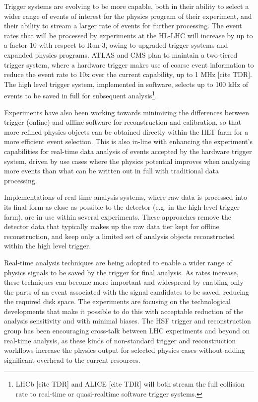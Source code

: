 \documentclass[10pt,a4paper]{article}
\begin{document}
Trigger systems are evolving to be more capable, both in their ability
to select a wider range of events of interest for the physics program of
their experiment, and their ability to stream a larger rate of events
for further processing. The event rates that will be processed by
experiments at the HL-LHC will increase by up to a factor 10 with
respect to Run-3, owing to upgraded trigger systems and expanded physics
programs. ATLAS and CMS plan to maintain a two-tiered trigger system,
where a hardware trigger makes use of coarse event information to reduce
the event rate to 10x over the current capability, up to 1 MHz {[}cite
TDR{]}. The high level trigger system, implemented in software, selects
up to 100 kHz of events to be saved in full for subsequent
analysis\footnote{LHCb {[}cite TDR{]} and ALICE {[}cite TDR{]} will both
  stream the full collision rate to real-time or quasi-realtime software
  trigger systems.}.

Experiments have also been working towards minimizing the differences
between trigger (online) and offline software for reconstruction and
calibration, so that more refined physics objects can be obtained
directly within the HLT farm for a more efficient event selection. This
is also in-line with enhancing the experiment's capabilities for
real-time data analysis of events accepted by the hardware trigger
system, driven by use cases where the physics potential improves when
analysing more events than what can be written out in full with
traditional data processing.

Implementations of real-time analysis systems, where raw data is
processed into its final form as close as possible to the detector (e.g.
in the high-level trigger farm), are in use within several experiments.
These approaches remove the detector data that typically makes up the
raw data tier kept for offline reconstruction, and keep only a limited
set of analysis objects reconstructed within the high level trigger.

Real-time analysis techniques are being adopted to enable a wider range
of physics signals to be saved by the trigger for final analysis. As
rates increase, these techniques can become more important and
widespread by enabling only the parts of an event associated with the
signal candidates to be saved, reducing the required disk space. The
experiments are focusing on the technological developments that make it
possible to do this with acceptable reduction of the analysis
sensitivity and with minimal biases. The HSF trigger and reconstruction
group has been encouraging cross-talk between LHC experiments and beyond
on real-time analysis, as these kinds of non-standard trigger and
reconstruction workflows increase the physics output for selected
physics cases without adding significant overhead to the current
resources.
\end{document}
